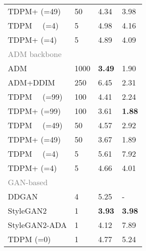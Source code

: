 \documentclass{article} \usepackage{iclr2023_conference,times}
\theoremstyle{plain}
\theoremstyle{definition}
\theoremstyle{remark}
\begin{document}
{\begin{table}[t]
\begin{minipage}[t]{.5\textwidth}
{\begin{tabular}{llll}
TDPM+ (=49) & 50                      & 4.34     &   3.98              \\ \hdashline
TDPM~~ (=4)  & 5                       & 4.98        & 4.16          \\
TDPM+ (=4)  & 5                       & 4.89        & 4.09             \\ \hline
\multicolumn{3}{l}{\textcolor{gray}{ADM backbone}} \\
ADM           & 1000                    & \textbf{3.49}     & 1.90         \\
ADM+DDIM           & 250                    & 6.45          & 2.31          \\
TDPM~~ (=99) & 100                     & 4.41     & 2.24              \\
TDPM+ (=99) & 100                     & 3.61    & \textbf{1.88}                \\ 
TDPM~~ (=49) & 50                      & 4.57   & 2.92               \\
TDPM+ (=49) & 50                      & 3.67    & 1.89             \\  TDPM~~ (=4)  & 5                       & 5.61   & 7.92              \\
TDPM+ (=4)  & 5                       & 4.66    & 4.01            \\ \hline
\multicolumn{3}{l}{\textcolor{gray}{GAN-based}} \\
{DDGAN} & {4}                       & {5.25}             & {-}      \\
StyleGAN2     & 1                       & \textbf{3.93}     & \textbf{3.98}     \\
StyleGAN2-ADA & 1                       & 4.12              & 7.89      \\
TDPM (=0)  & 1                       & 4.77      & 5.24          \\
\bottomrule[1.5pt]
 \end{tabular}}
\vspace{-5mm}
\end{minipage}\vspace{-5mm}
\end{table}

}
\end{document}
